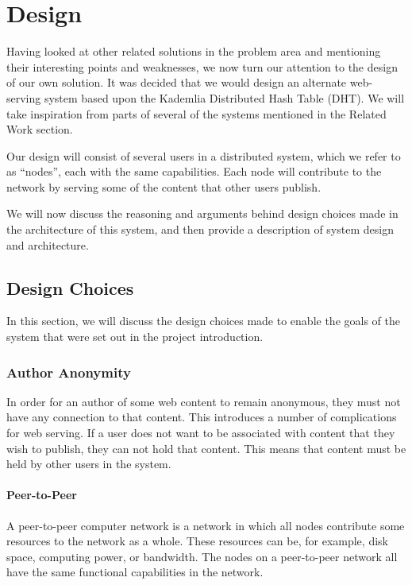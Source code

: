 \chapter{Design}

Having looked at other related solutions in the problem area and mentioning their
interesting points and weaknesses, we now turn our attention to the design of our own solution.
It was decided that we would design an alternate web-serving system based upon the Kademlia
Distributed Hash Table (DHT). We will take inspiration from parts of several of the systems
mentioned in the Related Work section.

Our design will consist of several users in a distributed system, which we refer to as ``nodes'',
each with the same capabilities. Each node will contribute to the network by serving some of the
content that other users publish.

We will now discuss the reasoning and arguments behind design choices made in the architecture of this system,
and then provide a description of system design and architecture.

\section{Design Choices}

In this section, we will discuss the design choices made to enable the goals of the system that
were set out in the project introduction.

\subsection{Author Anonymity}

In order for an author of some web content to remain anonymous, they must not have any connection
to that content. This introduces a number of complications for web serving. If a user does not want
to be associated with content that they wish to publish, they can not hold that content. This means
that content must be held by other users in the system.

\subsubsection{Peer-to-Peer}
A peer-to-peer computer network is a network in which all nodes contribute some resources to the
network as a whole. These resources can be, for example, disk space, computing power, or bandwidth.
The nodes on a peer-to-peer network all have the same functional capabilities in the network.

